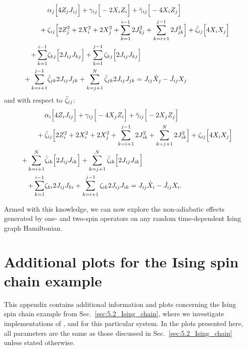 \begin{equation}\label{eq:ising_graph_minimise_zeta}
    \begin{aligned}
        &\alpha_j\Big[ 4 Z_j J_{ij} \Big] + \gamma_{ij}\Big[ - 2 X_i Z_i\Big] + \Bar{\gamma}_{ij} \Big[ - 4 X_i Z_j \Big] \\
        + \: &\zeta_{ij} \Big[ 2 Z_j^2 + 2X_i^2 + 2X_j^2 + \sum_{k = 1}^{i-1} 2 J_{kj}^2 + \sum_{k = i+1}^{j-1} 2 J_{jk}^2 \Big] + \Bar{\zeta}_{ij}\Big[ 4 X_i X_j \Big] \\
        + \sum_{k = 1}^{i-1} &\zeta_{kj}\Big[ 2 J_{ij} J_{kj} \Big] + \sum_{k = 1}^{j-1} \zeta_{kj} \Big[2 J_{ij}J_{kj}\Big] \\
        + \sum_{k = i +1}^{j-1} &\Bar{\zeta}_{jk} 2 J_{ij} J_{jk} + \sum_{k = j +1}^N \Bar{\zeta}_{jk} 2 J_{ij} J_{jk} = J_{ij} \dot{X}_j - \dot{J}_{ij} X_j
    \end{aligned}
\end{equation}
and with respect to $\Bar{\zeta}_{ij}$:
\begin{equation}\label{eq:ising_graph_minimise_zetabar}
    \begin{aligned}
        &\alpha_i\Big[ 4 Z_i J_{ij} \Big] + \gamma_{ij}\Big[ - 4 X_j Z_i\Big] + \Bar{\gamma}_{ij} \Big[ - 2 X_j Z_j \Big] \\
        + \: &\Bar{\zeta}_{ij} \Big[ 2 Z_i^2 + 2X_i^2 + 2X_j^2 + \sum_{k = i+1}^{j-1} 2 J_{ik}^2 + \sum_{k = j+1}^N 2 J_{ik}^2 \Big] + \zeta_{ij}\Big[ 4 X_i X_j \Big] \\
        + \sum_{k = i+1}^N &\Bar{\zeta}_{ik}\Big[ 2 J_{ij} J_{ik} \Big] + \sum_{k = j+1}^N \Bar{\zeta}_{ik} \Big[2 J_{ij}J_{ik}\Big] \\
        + \sum_{k = 1}^{i-1} &\zeta_{ki} 2 J_{ij} J_{ki} + \sum_{k = i+1}^{j-1} \zeta_{ik} 2 J_{ij} J_{ik} = J_{ij} \dot{X}_i - \dot{J}_{ij} X_i.
    \end{aligned}
\end{equation}

Armed with this knowledge, we can now explore the non-adiabatic effects generated by one- and two-spin operators on any random time-dependent Ising graph Hamiltonian. 

\chapter{Additional plots for the Ising spin chain example}\label{app:ising}

This appendix contains additional information and plots concerning the Ising spin chain example from Sec.~\ref{sec:5.2_Ising_chain}, where we investigate implementations of ,  and  for this particular system. In the plots presented here, all parameters are the same as those discussed in Sec.~\ref{sec:5.2_Ising_chain} unless stated otherwise.

